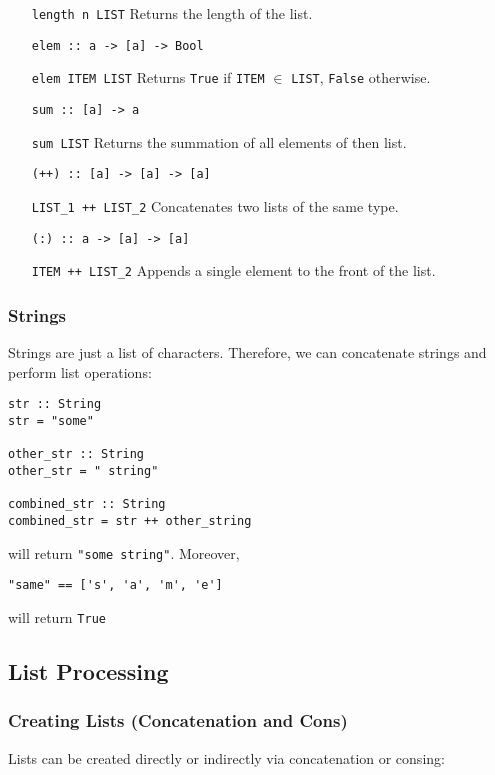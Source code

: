 \documentclass{article}
\begin{document}
\begin{enumerate}[align=left]
\item [\texttt{length n LIST}] Returns the length of the list. \\
\item [\texttt{elem :: a -> [a] -> Bool}]
\item [\texttt{elem ITEM LIST}] Returns \texttt{True} if
  \texttt{ITEM} $\in$ \texttt{LIST}, \texttt{False} otherwise. \\
\item [\texttt{sum :: [a] -> a}]
\item [\texttt{sum LIST}] Returns the summation of all elements of then
  list. \\
\item [\texttt{(++) :: [a] -> [a] -> [a]}]
\item [\texttt{LIST\_1 ++ LIST\_2}] Concatenates two lists of the same
  type. \\
\item [\texttt{(:) :: a -> [a] -> [a]}]
\item [\texttt{ITEM ++ LIST\_2}] Appends a single element to the front
  of the list. \\
\end{enumerate}





\subsubsection{Strings}
Strings are just a list of characters. Therefore, we can concatenate
strings and perform list operations:
\begin{verbatim}
str :: String
str = "some"

other_str :: String
other_str = " string"

combined_str :: String
combined_str = str ++ other_string \end{verbatim}
will return \texttt{"some string"}. Moreover,
\begin{verbatim}
"same" == ['s', 'a', 'm', 'e']
\end{verbatim}
will return \texttt{True}





\subsection{List Processing}
\subsubsection{Creating Lists (Concatenation and Cons)} Lists can be
created directly or indirectly via concatenation or consing:
\end{document}
